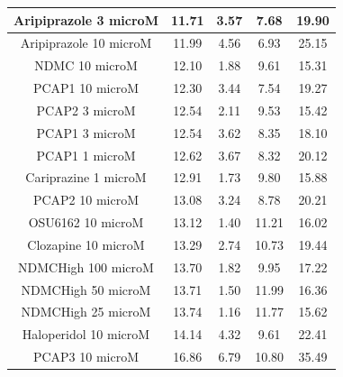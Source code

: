 \documentclass[a4paper,12pt]{article}
\begin{document}
\begin{table}[h!]
\begin{tabular}{|c|c|c|c|c|}
Aripiprazole 3 microM  & 11.71 & 3.57 & 7.68  & 19.90  \\ \hline
Aripiprazole 10 microM & 11.99 & 4.56 & 6.93  & 25.15 \\ \hline
NDMC 10 microM         & 12.10  & 1.88 & 9.61  & 15.31 \\ \hline
PCAP1 10 microM        & 12.30  & 3.44 & 7.54  & 19.27 \\ \hline
PCAP2 3 microM         & 12.54 & 2.11 & 9.53  & 15.42 \\ \hline
PCAP1 3 microM         & 12.54 & 3.62 & 8.35  & 18.10  \\ \hline
PCAP1 1 microM         & 12.62 & 3.67 & 8.32  & 20.12 \\ \hline
Cariprazine 1 microM   & 12.91 & 1.73 & 9.80   & 15.88 \\ \hline
PCAP2 10 microM        & 13.08 & 3.24 & 8.78  & 20.21 \\ \hline
OSU6162 10 microM      & 13.12 & 1.40  & 11.21 & 16.02 \\ \hline
Clozapine 10 microM    & 13.29 & 2.74 & 10.73 & 19.44 \\ \hline
NDMCHigh 100 microM    & 13.70  & 1.82 & 9.95  & 17.22 \\ \hline
NDMCHigh 50 microM     & 13.71 & 1.50  & 11.99 & 16.36 \\ \hline
NDMCHigh 25 microM     & 13.74 & 1.16 & 11.77 & 15.62 \\ \hline
Haloperidol 10 microM  & 14.14 & 4.32 & 9.61  & 22.41 \\ \hline
PCAP3 10 microM      & 16.86 & 6.79 & 10.80  & 35.49 \\ \hline
\end{tabular}
\end{table}
\newpage
\end{document}

